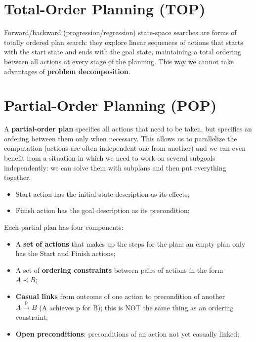 \documentclass{article}
\begin{document}
\newpage

\section{Total-Order Planning (TOP)}

Forward/backward (progression/regression) state-space searches are forms of totally ordered plan search: they explore linear sequences of actions that starts with the start state and ends with the goal state, maintaining a total ordering between all actions at every stage of the planning. This way we cannot take advantages of \textbf{problem decomposition}.

\section{Partial-Order Planning (POP)}

A \textbf{partial-order plan} specifies all actions that need to be taken, but specifies an ordering between them only when necessary. This allows us to parallelize the computation (actions are often independent one from another) and we can even benefit from a situation in which we need to work on several subgoals independently: we can solve them with subplans and then put everything together. \\

\begin{itemize}
    \item Start action has the initial state description as its effects;
    \item Finish action has the goal description as its precondition;
\end{itemize}

\begin{flushleft}
    Each partial plan has four components:
\end{flushleft}

\begin{itemize}
    \item A \textbf{set of actions} that makes up the steps for the plan; an empty plan only has the Start and Finish actions;
    \item A set of \textbf{ordering constraints} between pairs of actions in the form \\ $A \prec B$;
    \item \textbf{Casual links} from outcome of one action to precondition of another \\ $A \xrightarrow{\text{p}} B$ (A achieves p for B); this is NOT the same thing as an ordering constraint;
    \item \textbf{Open preconditions}: preconditions of an action not yet casually linked;

\end{itemize}
\end{document}
